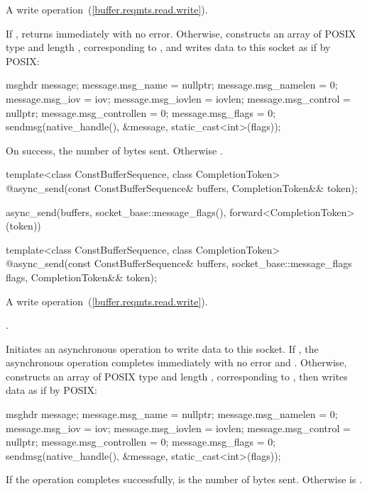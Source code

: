 \begin{itemdescr}
\pnum
A write operation~(\ref{buffer.reqmts.read.write}).

\pnum
\effects If , returns immediately with no error. Otherwise, constructs an array  of POSIX type  and length , corresponding to , and writes data to this socket as if by POSIX: 
\begin{codeblock}
msghdr message;
message.msg_name = nullptr;
message.msg_namelen = 0;
message.msg_iov = iov;
message.msg_iovlen = iovlen;
message.msg_control = nullptr;
message.msg_controllen = 0;
message.msg_flags = 0;
sendmsg(native_handle(), &message, static_cast<int>(flags));
\end{codeblock}


\pnum
\returns On success, the number of bytes sent. Otherwise .
\end{itemdescr}

\begin{itemdecl}
template<class ConstBufferSequence, class CompletionToken>
  @\DEDUCED@ async_send(const ConstBufferSequence& buffers, CompletionToken&& token);
\end{itemdecl}

\begin{itemdescr}
\pnum
\returns
\begin{codeblock}
async_send(buffers, socket_base::message_flags(), forward<CompletionToken>(token))
\end{codeblock}
\end{itemdescr}

\begin{itemdecl}
template<class ConstBufferSequence, class CompletionToken>
  @\DEDUCED@ async_send(const ConstBufferSequence& buffers,
                     socket_base::message_flags flags,
                     CompletionToken&& token);
\end{itemdecl}

\begin{itemdescr}
\pnum
A write operation~(\ref{buffer.reqmts.read.write}).

\pnum
\completionsig {}.

\pnum
\effects Initiates an asynchronous operation to write data to this socket. If , the asynchronous operation completes immediately with no error and . Otherwise, constructs an array  of POSIX type  and length , corresponding to , then writes data as if by POSIX:
\begin{codeblock}
msghdr message;
message.msg_name = nullptr;
message.msg_namelen = 0;
message.msg_iov = iov;
message.msg_iovlen = iovlen;
message.msg_control = nullptr;
message.msg_controllen = 0;
message.msg_flags = 0;
sendmsg(native_handle(), &message, static_cast<int>(flags));
\end{codeblock}


\pnum
If the operation completes successfully,  is the number of bytes sent. Otherwise  is .
\end{itemdescr}

